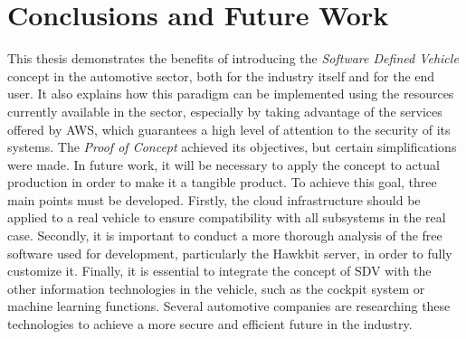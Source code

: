 \documentclass[10pt,a4paper,roman, twocolumn]{article}
\begin{document}
\section{Conclusions and Future Work}
This thesis demonstrates the benefits of introducing the \textit{Software Defined Vehicle} concept in the automotive sector, both for the industry itself and for the end user. It also explains how this paradigm can be implemented using the resources currently available in the sector, especially by taking advantage of the services offered by AWS, which guarantees a high level of attention to the security of its systems.
The \textit{Proof of Concept} achieved its objectives, but certain simplifications were made. In future work, it will be necessary to apply the concept to actual production in order to make it a tangible product. To achieve this goal, three main points must be developed. Firstly, the cloud infrastructure should be applied to a real vehicle to ensure compatibility with all subsystems in the real case. Secondly, it is important to conduct a more thorough analysis of the free software used for development, particularly the Hawkbit server, in order to fully customize it. Finally, it is essential to integrate the concept of SDV with the other information technologies in the vehicle, such as the cockpit system or machine learning functions. Several automotive companies are researching these technologies to achieve a more secure and efficient future in the industry.
	 
\end{document}
